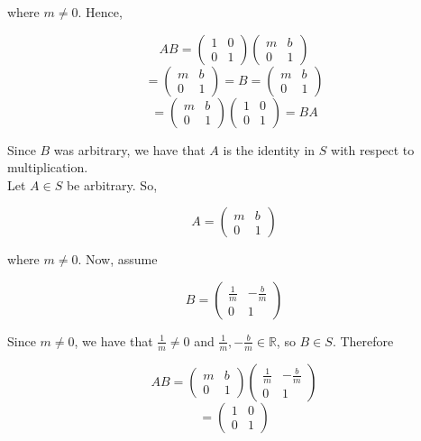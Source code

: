 \begin{solution}
    where $m\neq0$. Hence,
    
    $$AB=\left(\begin{array}{cc} 1 & 0\\ 0 & 1 \end{array}\right)
    \left(\begin{array}{cc} m & b\\ 0 & 1 \end{array}\right)$$
    $$=\left(\begin{array}{cc} m & b\\ 0 & 1 \end{array}\right)=B=
    \left(\begin{array}{cc} m & b\\ 0 & 1 \end{array}\right)$$
    $$=\left(\begin{array}{cc} m & b\\ 0 & 1 \end{array}\right)
    \left(\begin{array}{cc} 1 & 0\\ 0 & 1 \end{array}\right)=BA$$
    
    Since $B$ was arbitrary, we have that $A$ is the identity in $S$ with respect to multiplication.\\

    Let $A\in S$ be arbitrary. So,
    
    $$A=\left ( \begin{array}{cc} m & b\\ 0 & 1 \end{array} \right )$$
    
    where $m\neq0$. Now, assume
    
    $$B=\left ( \begin{array}{cc} \frac1m & -\frac{b}{m}\\ 0 & 1 \end{array} \right )$$
    
    Since $m\neq0$, we have that $\frac1m\neq0$ and $\frac1m,-\frac{b}{m}\in\mathbb{R}$, so $B\in S$.
    Therefore
    
    $$AB=\left(\begin{array}{cc} m & b\\ 0 & 1 \end{array}\right)
    \left(\begin{array}{cc} \frac1m & -\frac{b}{m}\\ 0 & 1 \end{array}\right)$$
    $$=\left(\begin{array}{cc} 1 & 0\\ 0 & 1 \end{array}\right)$$
    

\end{solution}
